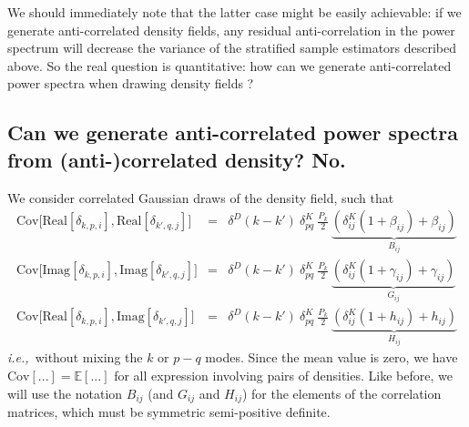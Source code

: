 \documentclass{aastex6}
\newcommand{\ie}{{\textit{i.e.,}~}}
\newcommand{\eqn}[1]{\begin{eqnarray}#1\end{eqnarray}}
\begin{document}
We should immediately note that the latter case might be easily achievable: if we generate anti-correlated density fields, any residual anti-correlation in the power spectrum will decrease the variance of the stratified sample estimators described above. So the real question is quantitative: how can we generate anti-correlated power spectra when drawing density fields ?


\subsection{Can we generate anti-correlated power spectra from (anti-)correlated density? No.}

We consider correlated Gaussian draws of the density field, such that
\eqn{
	\mathrm{Cov}\bigl[\mathrm{Real}[\delta_{k, p, i}], \mathrm{Real}[\delta_{k', q, j}]\bigr] &=& \delta^D(k-k') \ \delta^K_{pq}\  \frac{P_k}{2}\ \underbrace{( \delta^K_{ij}(1+\beta_{ij}) + \beta_{ij})}_{B_{ij}}	\\
	\mathrm{Cov}\bigl[\mathrm{Imag}[\delta_{k, p, i}], \mathrm{Imag}[\delta_{k', q, j}] \bigr] &=& \delta^D(k-k') \ \delta^K_{pq}\  \frac{P_k}{2}\ \underbrace{( \delta^K_{ij}(1+\gamma_{ij}) + \gamma_{ij})}_{G_{ij}}\\
	\mathrm{Cov}\bigl[\mathrm{Real}[\delta_{k, p, i}], \mathrm{Imag}[\delta_{k', q, j}] \bigr] &=& \delta^D(k-k') \ \delta^K_{pq}\  \frac{P_k}{2}\ \underbrace{( \delta^K_{ij}(1+h_{ij}) + h_{ij})}_{H_{ij}}
}
\ie without mixing the $k$ or $p-q$ modes.
Since the mean value is zero, we have $\mathrm{Cov}[...] = \mathbb{E}[...]$ for all expression involving pairs of densities.
Like before, we will use the notation $B_{ij}$ (and $G_{ij}$ and $H_{ij}$) for the elements of the correlation matrices, which must be symmetric semi-positive definite.
\end{document}
